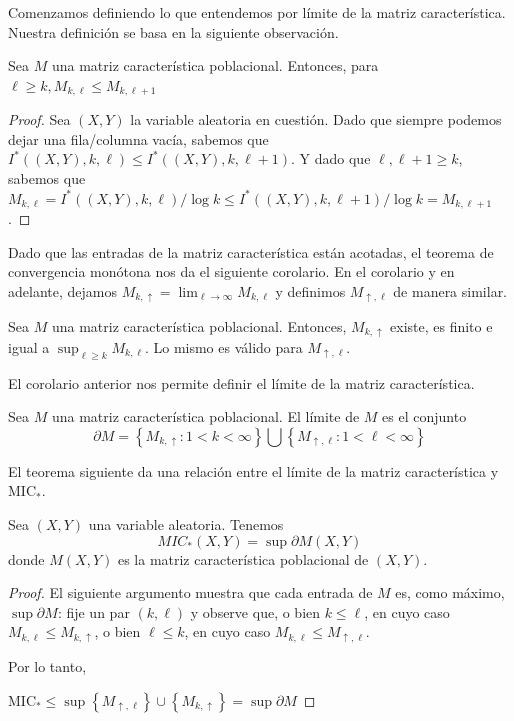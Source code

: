 	Comenzamos definiendo lo que entendemos por l\'imite de la matriz caracter\'istica. Nuestra definici\'on se basa en la siguiente observaci\'on.
	\begin{prop}
		Sea $M$ una matriz caracter\'istica poblacional. Entonces, para $\ell \geq k, M_{k, \ell} \leq M_{k, \ell+1}$
	\end{prop}
	\begin{proof}
		Sea $(X, Y)$ la variable aleatoria en cuesti\'on. Dado que siempre podemos dejar una fila/columna vac\'ia, sabemos que $I^*((X, Y), k, \ell) \leq I^*((X, Y), k, \ell+1)$. Y dado que $\ell, \ell+1 \geq k$, sabemos que $M_{k, \ell}=I^*((X, Y), k, \ell) / \log k \leq I^*((X, Y), k, \ell+1) / \log k=M_{k, \ell+1}$.
	\end{proof}

	Dado que las entradas de la matriz caracter\'istica est\'an acotadas, el teorema de convergencia mon\'otona nos da el siguiente corolario. En el corolario y en adelante, dejamos $M_{k, \uparrow}=\lim _{\ell \rightarrow \infty} M_{k, \ell}$ y definimos $M_{\uparrow, \ell}$ de manera similar.
	\begin{cor}
		Sea $M$ una matriz caracter\'istica poblacional. Entonces, $M_{k, \uparrow}$ existe, es finito e igual a $\sup _{\ell \geq k} M_{k, \ell}$. Lo mismo es v\'alido para $M_{\uparrow, \ell}$.
	\end{cor}

	El corolario anterior nos permite definir el l\'imite de la matriz caracter\'istica.

	\begin{defn}
		Sea $M$ una matriz caracter\'istica poblacional. El l\'imite de $M$ es el conjunto
		$$
		\partial M=\left\{M_{k, \uparrow}: 1<k<\infty\right\} \bigcup\left\{M_{\uparrow, \ell}: 1<\ell<\infty\right\}
		$$
	\end{defn}
	
	El teorema siguiente da una relaci\'on entre el l\'imite de la matriz caracter\'istica y $\mathrm{MIC}_*$.
	\begin{thm}
	Sea $(X, Y)$ una variable aleatoria. Tenemos
	$$
	M I C_*(X, Y)=\sup \partial M(X, Y)
	$$
	donde $M(X, Y)$ es la matriz caracter\'istica poblacional de $(X, Y)$.
	\end{thm}
	\begin{proof}
		El siguiente argumento muestra que cada entrada de $M$ es, como m\'aximo, $\sup \partial M$: fije un par $(k, \ell)$ y observe que, o bien $k \leq \ell$, en cuyo caso $M_{k, \ell} \leq M_{k, \uparrow}$, o bien $\ell \leq k$, en cuyo caso $M_{k, \ell} \leq M_{\uparrow, \ell}$. 
		
		Por lo tanto, 
		
		$\mathrm{MIC}_* \leq \sup \left\{M_{\uparrow, \ell}\right\} \cup\left\{M_{k, \uparrow}\right\}=\sup \partial M$
	\end{proof}
	
